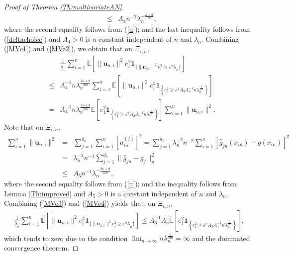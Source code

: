 \documentclass[12pt]{article}
\theoremstyle{plain}
\theoremstyle{remark}
\begin{document}
\begin{proof}[Proof of Theorem \ref{Th:multivariateAN}]
\begin{eqnarray}
        &\leq & A_4 n^{-2}\lambda_n^{-\frac{k+d}{m}},\label{MVe2}
    \end{eqnarray}
    where the second equality follows from (\ref{u}); and the last inequality follows from (\ref{deltachoice}) and $A_4>0$ is a constant independent of $n$ and $\lambda_n$. Combining (\ref{MVe1}) and (\ref{MVe2}), we obtain that on $\Xi_{\epsilon,n}$,
    \begin{eqnarray}
        &&\frac{1}{\underline{\lambda}_n}\sum_{i=1}^n\mathbb{E}\left[\|\mathbf{u}_{n,i}\|^2e_i^2\mathbf{1}_{\{\|\mathbf{u}_{n,i}\|^2e_i^2\geq \varepsilon^2 \underline{\lambda}_n\}}\right]\nonumber\\
        &\leq&A_3^{-1}n\lambda_n^{\frac{2k+d}{2m}}\sum_{i=1}^n\mathbb{E}\left[\|\mathbf{u}_{n,i}\|^2 e_i^2\mathbf{1}_{\left\{e_i^2\geq \varepsilon^2 A_3A_4^{-1}n\lambda_n^{\frac{d}{2m}}\right\}}\right]\nonumber\\
        &=&A_3^{-1}n\lambda_n^{\frac{2k+d}{2m}}\mathbb{E}\left[ e_1^2\mathbf{1}_{\left\{e_1^2\geq \varepsilon^2 A_3A_4^{-1}n\lambda_n^{\frac{d}{2m}}\right\}}\right]\sum_{i=1}^n\|\mathbf{u}_{n,i}\|^2.\label{MVe3}
    \end{eqnarray}
    Note that on $\Xi_{\epsilon,n}$,
    \begin{eqnarray}
        \sum_{i=1}^n\|\mathbf{u}_{n,i}\|^2&=&\sum_{j=1}^{d_0}\sum_{i=1}^n \left[u_{in}^{(j)}\right]^2=\sum_{j=1}^{d_0}\lambda^{-2}_nn^{-2}\sum_{i=1}^{n}\left[\hat{g}_{jn}(x_{in})-g(x_{in})\right]^2\nonumber\\
        &=&\lambda^{-2}_n n^{-1}\sum_{j=1}^{d_0}\|\hat{g}_{jn}-g_j\|^2_n\nonumber\\
        &\leq& A_5 n^{-1}\lambda_n^{-\frac{2k+d}{2m}},\label{MVe4}
    \end{eqnarray}
    where the second equality follows from (\ref{u}); and the inequality follows from Lemma \ref{Th:improved} and $A_5>0$ is a constant independent of $n$ and $\lambda_n$. Combining (\ref{MVe3}) and (\ref{MVe4}) yields that, on $\Xi_{\epsilon,n}$,
    \begin{eqnarray*}
        \frac{1}{\underline{\lambda}_n}\sum_{i=1}^n\mathbb{E}\left[\|\mathbf{u}_{n,i}\|^2e_i^2\mathbf{1}_{\{\|\mathbf{u}_{n,i}\|^2e_i^2\geq \varepsilon^2 \underline{\lambda}_n\}}\right]\leq A_3^{-1}A_5\mathbb{E}\left[ e_1^2\mathbf{1}_{\left\{e_1^2\geq \varepsilon^2 A_3A_4^{-1}n\lambda_n^{\frac{d}{2m}}\right\}}\right],
    \end{eqnarray*}
    which tends to zero due to the condition $\lim_{n\rightarrow\infty}n\lambda_n^{\frac{d}{2m}}=\infty$ and the dominated convergence theorem.


\end{proof}
\end{document}

